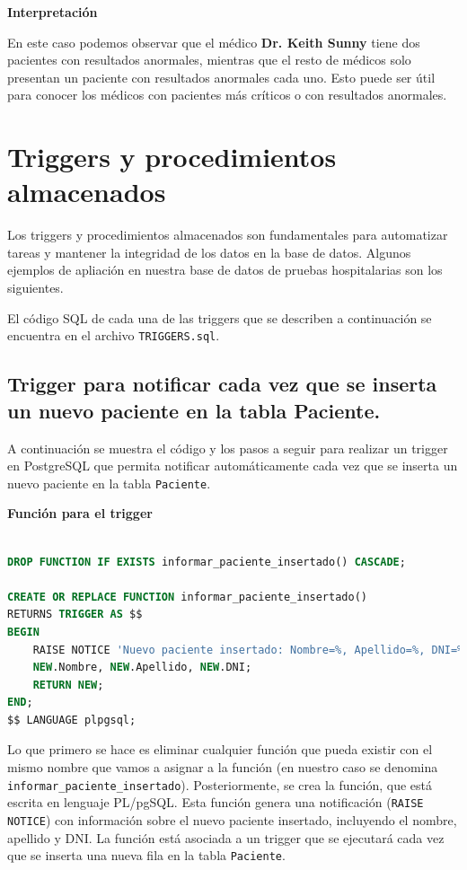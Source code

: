 \documentclass[spanish]{article}
\begin{document}
\textbf{Interpretación}

En este caso podemos observar que el médico \textbf{Dr. Keith Sunny} tiene dos pacientes con resultados anormales, mientras que el resto de médicos solo presentan un paciente con resultados anormales cada uno. Esto puede ser útil para conocer los médicos con pacientes más críticos o con resultados anormales.


\newpage
\section{Triggers y procedimientos almacenados}

Los triggers y procedimientos almacenados son fundamentales para automatizar tareas y mantener la integridad de los datos en la base de datos. Algunos ejemplos de apliación en nuestra base de datos de pruebas hospitalarias son los siguientes.  

El código SQL de cada una de las triggers que se describen a continuación se encuentra en el archivo \texttt{TRIGGERS.sql}.


\subsection{Trigger para notificar cada vez que se inserta un nuevo paciente en la tabla Paciente.}

A continuación se muestra el código y los pasos a seguir para realizar un trigger en PostgreSQL que permita notificar automáticamente cada vez que se inserta un nuevo paciente en la tabla \texttt{Paciente}.

\textbf{Función para el trigger}

\begin{lstlisting}[language=SQL] 

DROP FUNCTION IF EXISTS informar_paciente_insertado() CASCADE;

CREATE OR REPLACE FUNCTION informar_paciente_insertado() 
RETURNS TRIGGER AS $$ 
BEGIN 
    RAISE NOTICE 'Nuevo paciente insertado: Nombre=%, Apellido=%, DNI=%',
    NEW.Nombre, NEW.Apellido, NEW.DNI; 
    RETURN NEW; 
END; 
$$ LANGUAGE plpgsql; 
\end{lstlisting}

Lo que primero se hace es eliminar cualquier función que pueda existir con el mismo nombre que vamos a asignar a la función (en nuestro caso se denomina \texttt{informar\_paciente\_insertado}). Posteriormente, se crea la función, que está escrita en lenguaje PL/pgSQL. Esta función genera una notificación (\texttt{RAISE NOTICE}) con información sobre el nuevo paciente insertado, incluyendo el nombre, apellido y DNI. La función está asociada a un trigger que se ejecutará cada vez que se inserta una nueva fila en la tabla \texttt{Paciente}.
\end{document}
